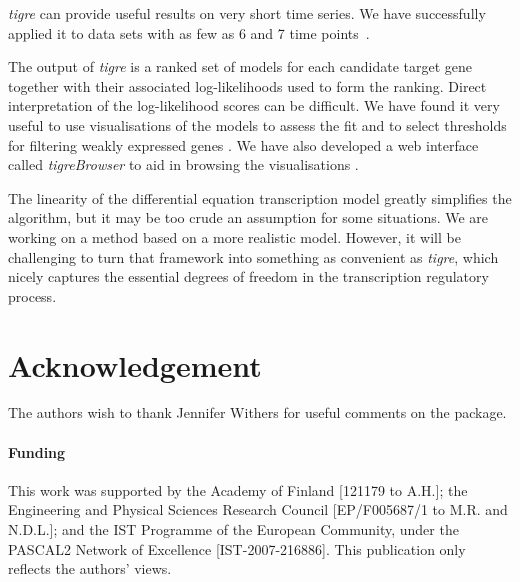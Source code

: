 \documentclass{bioinfo}
\newcommand{\tigre}{\emph{tigre}}
\begin{document}
\tigre{} can provide useful results on very short time series.  We
have successfully applied it to data sets with as few as 6 and 7 time
points~\citep{Honkela2010PNAS,Honkela2010MLSP}.

The output of \tigre{} is a ranked set of models for each candidate
target gene together with their associated log-likelihoods used to
form the ranking.  Direct interpretation of the log-likelihood scores
can be difficult.  We have found it very useful to use visualisations
of the models to assess the fit and to select thresholds for filtering
weakly expressed genes \citep[for details, see][]{Honkela2010PNAS}.
We have also developed a web interface called \emph{tigreBrowser} to
aid in browsing the visualisations \citep{Matikainen2010tigreBrowser}.

The linearity of the differential equation transcription model greatly
simplifies the algorithm, but it may be too crude an assumption for some
situations.  We are working on a method based on a more realistic
model.  However, it will be challenging to turn that framework into
something as convenient as \tigre{}, which nicely captures the
essential degrees of freedom in the transcription regulatory process.

\section*{Acknowledgement}

The authors wish to thank Jennifer Withers for useful comments on the
package.

\paragraph{Funding\textcolon}
This work was supported by the Academy of Finland [121179 to A.H.];
the Engineering and Physical Sciences Research Council [EP/F005687/1
to M.R. and N.D.L.]; and
the IST Programme of the European Community, under the PASCAL2
Network of Excellence [IST-2007-216886].
This publication only reflects the authors' views.

\small



\end{document}
